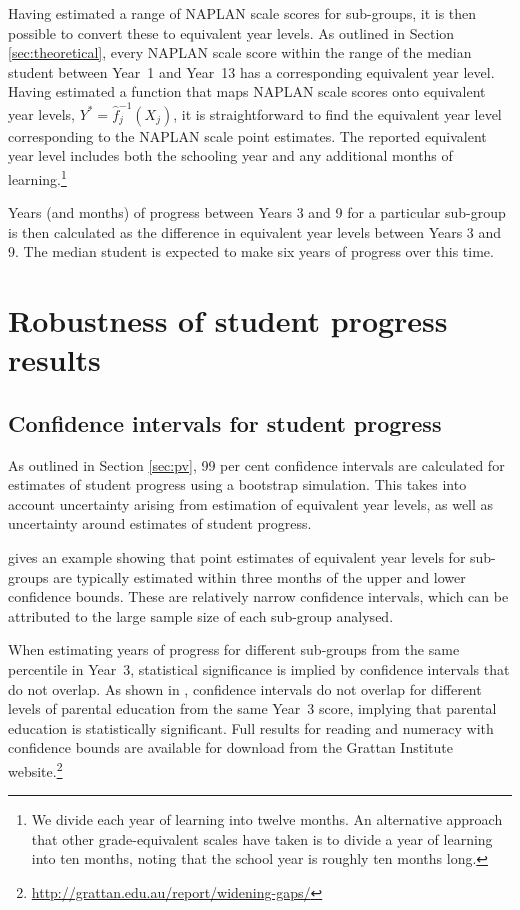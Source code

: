 Having estimated a range of NAPLAN scale scores for sub-groups, it is then possible to convert these to equivalent year levels. As outlined in Section \ref{sec:theoretical}, every NAPLAN scale score within the range of the median student between \mbox{Year 1} and \mbox{Year 13} has a corresponding equivalent year level. Having estimated a function that maps NAPLAN scale scores onto equivalent year levels, $Y^{*} = \widehat{f}_{j}^{-1}\left(X_{j}\right)$, it is straightforward to find the equivalent year level corresponding to the NAPLAN scale point estimates. The reported equivalent year level includes both the schooling year and any additional months of learning.\footnote{We divide each year of learning into twelve months. An alternative approach that other grade-equivalent scales have taken is to divide a year of learning into ten months, noting that the school year is roughly ten months long.}

Years (and months) of progress between Years 3 and 9 for a particular sub-group is then calculated as the difference in equivalent year levels between Years 3 and 9. The median student is expected to make six years of progress over this time.

\section{Robustness of student progress results} \label{sec:robust_progress}

\subsection{Confidence intervals for student progress}

As outlined in Section \ref{sec:pv}, 99 per cent confidence intervals are calculated for estimates of student progress using a bootstrap simulation. This takes into account uncertainty arising from estimation of equivalent year levels, as well as uncertainty around estimates of student progress.

 gives an example showing that point estimates of equivalent year levels for sub-groups are typically estimated within three months of the upper and lower confidence bounds. These are relatively narrow confidence intervals, which can be attributed to the large sample size of each sub-group analysed.

When estimating years of progress for different sub-groups from the same percentile in \mbox{Year 3}, statistical significance is implied by confidence intervals that do not overlap. As shown in , confidence intervals do not overlap for different levels of parental education from the same \mbox{Year 3} score, implying that parental education is statistically significant. Full results for reading and numeracy with confidence bounds are available for download from the Grattan Institute website.\footnote{\url{http://grattan.edu.au/report/widening-gaps/}}

